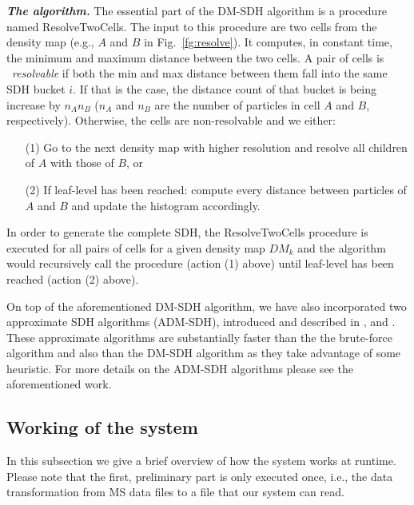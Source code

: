 \documentclass[10pt,journal,final,letterpaper,twocolumn]{IEEEtran}
\begin{document}
\emph{\textbf{The algorithm.}} The essential part of the DM-SDH
algorithm is a procedure named {\sc ResolveTwoCells}. The input to
this procedure are two cells from the density map (e.g., $A$ and $B$
in Fig.~\ref{fg:resolve}). It computes, in constant time, the
minimum and maximum distance between the two cells. A pair of cells
is ~\emph{resolvable} if both the min and max distance between them
fall into the same SDH bucket $i$. If that is the case, the distance
count of that bucket is being increase by $n_{A}n_{B}$ ($n_{A}$ and
$n_{B}$ are the number of particles in cell $A$ and $B$,
respectively). Otherwise, the cells are non-resolvable and we
either:
\begin{itemize}
\item[(1)] Go to the next density map with higher resolution and resolve all children of $A$
with those of $B$, or
\item[(2)] If leaf-level has been reached: compute every distance between particles of $A$ and $B$ and update the
histogram accordingly.
\end{itemize}

In order to generate the complete SDH, the {\sc ResolveTwoCells}
procedure is executed for all pairs of cells for a given density map
$DM_k$ and the algorithm would recursively call the procedure
(action (1) above) until leaf-level has been reached (action (2)
above).

On top of the aforementioned DM-SDH algorithm, we have also
incorporated two approximate SDH algorithms (ADM-SDH), introduced
and described in \cite{EDBT12}, and \cite{TKDE12}. These approximate
algorithms are substantially faster than the the brute-force
algorithm and also than the DM-SDH algorithm as they take advantage
of some heuristic. For more details on the ADM-SDH algorithms please
see the aforementioned work.




\subsection{Working of the system}

In this subsection we give a brief overview of how the system works
at runtime. Please note that the first, preliminary part is only
executed once, i.e., the data transformation from MS data files to a
file that our system can read.
\end{document}
